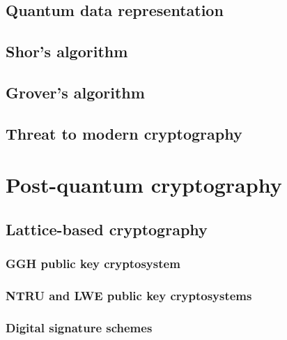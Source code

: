 \section{Quantum data representation}
\label{sec:quantum_data_repr}


\section{Shor's algorithm}
\label{sec:shors_algorithm}


\section{Grover's algorithm}
\label{sec:grovers_alg}


\section{Threat to modern cryptography}
\label{sec:threat_to_modern}


\chapter{Post-quantum cryptography}
\label{ch:pq_crypto}


\section{Lattice-based cryptography}
\label{sec:lattice_based_crypto}


\subsection{GGH public key cryptosystem}
\label{sec:ggh}


\subsection{NTRU and LWE public key cryptosystems}
\label{sec:ntru_lwe}


\subsection{Digital signature schemes}
\label{sec:lattice_digital_schemes}


